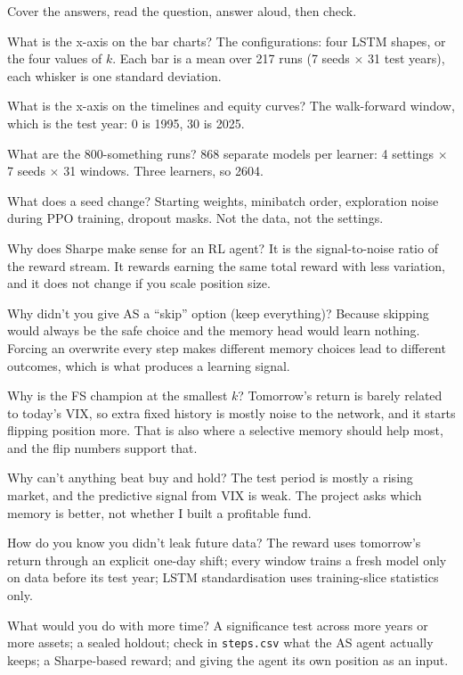 \documentclass[11pt,a4paper]{article}
\begin{document}
Cover the answers, read the question, answer aloud, then check.

\begin{qa}{What is the x-axis on the bar charts?}
The configurations: four LSTM shapes, or the four values of $k$. Each bar is a mean over 217
runs (7 seeds $\times$ 31 test years), each whisker is one standard deviation.
\end{qa}
\begin{qa}{What is the x-axis on the timelines and equity curves?}
The walk-forward window, which is the test year: 0 is 1995, 30 is 2025.
\end{qa}
\begin{qa}{What are the 800-something runs?}
868 separate models per learner: 4 settings $\times$ 7 seeds $\times$ 31 windows. Three
learners, so 2604.
\end{qa}
\begin{qa}{What does a seed change?}
Starting weights, minibatch order, exploration noise during PPO training, dropout masks. Not
the data, not the settings.
\end{qa}
\begin{qa}{Why does Sharpe make sense for an RL agent?}
It is the signal-to-noise ratio of the reward stream. It rewards earning the same total reward
with less variation, and it does not change if you scale position size.
\end{qa}
\begin{qa}{Why didn't you give AS a ``skip'' option (keep everything)?}
Because skipping would always be the safe choice and the memory head would learn nothing. Forcing
an overwrite every step makes different memory choices lead to different outcomes, which is
what produces a learning signal.
\end{qa}
\begin{qa}{Why is the FS champion at the smallest $k$?}
Tomorrow's return is barely related to today's VIX, so extra fixed history is mostly noise to
the network, and it starts flipping position more. That is also where a selective memory
should help most, and the flip numbers support that.
\end{qa}
\begin{qa}{Why can't anything beat buy and hold?}
The test period is mostly a rising market, and the predictive signal from VIX is weak. The
project asks which memory is better, not whether I built a profitable fund.
\end{qa}
\begin{qa}{How do you know you didn't leak future data?}
The reward uses tomorrow's return through an explicit one-day shift; every window trains a
fresh model only on data before its test year; LSTM standardisation uses training-slice
statistics only.
\end{qa}
\begin{qa}{What would you do with more time?}
A significance test across more years or more assets; a sealed holdout; check in
\texttt{steps.csv} what the AS agent actually keeps; a Sharpe-based reward; and giving the agent
its own position as an input.
\end{qa}
\end{document}
